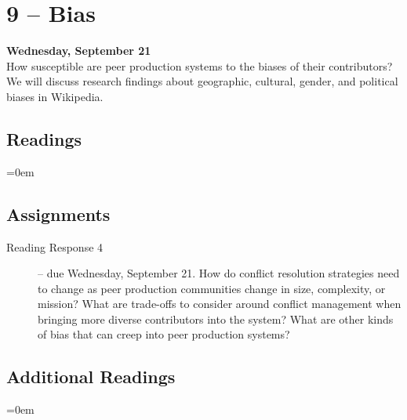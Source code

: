 \documentclass[10pt]{memoir}
\newenvironment{readinglist}{
\begin{list}{}{\leftmargin=8pt \itemindent=0em}
  \setlength{\itemsep}{8pt}
  \setlength{\parskip}{0em}
  \setlength{\parsep}{1em}
  \setlength{\parindent}{8em}}
{\end{list}}
\begin{document}
\section{9 -- Bias}
\textcolor{CUGold}{\textbf{Wednesday, September 21}}\\
How susceptible are peer production systems to the biases of their contributors? We will discuss research findings about geographic, cultural, gender, and political biases in Wikipedia.

    \subsection{Readings}
    \begin{readinglist}
        \item {}
        \item {}
        \item {}
    \end{readinglist}
    
    \subsection{Assignments}
    \begin{description}%
        \item[Reading Response 4 ] -- due Wednesday, September 21. How do conflict resolution strategies need to change as peer production communities change in size, complexity, or mission? What are trade-offs to consider around conflict management when bringing more diverse contributors into the system? What are other kinds of bias that can creep into peer production systems?
    \end{description}
    
    \subsection{Additional Readings}
    \begin{readinglist}
        \item {}
        \item {}
        \item {}
        \item {}
        \item {}
        \item {}
        \item {}
    \end{readinglist}
\end{document}
